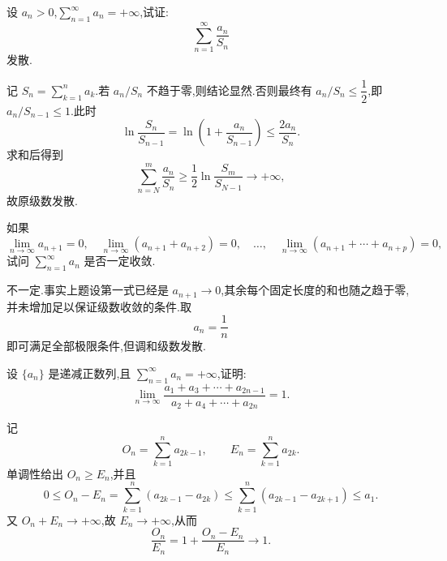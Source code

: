 \begin{example}
    设 $a_n>0$,$\displaystyle\sum\limits_{n=1}^{\infty}a_n=+\infty$,试证:
    \[
        \displaystyle\sum\limits_{n=1}^{\infty}\dfrac{a_n}{S_n}
    \]
    发散.
\end{example}
\exampleblank

\begin{solution}
    记 $\displaystyle S_n=\sum\limits_{k=1}^{n}a_k$.若 $a_n/S_n$ 不趋于零,则结论显然.否则最终有 $a_n/S_n\leq\dfrac{1}{2}$,即 $a_n/S_{n-1}\leq1$.此时
    \[
        \ln\dfrac{S_n}{S_{n-1}}
        =\ln\left(1+\dfrac{a_n}{S_{n-1}}\right)
        \leq\dfrac{2a_n}{S_n}.
    \]
    求和后得到
    \[
        \displaystyle\sum\limits_{n=N}^{m}\dfrac{a_n}{S_n}
        \geq\dfrac{1}{2}\ln\dfrac{S_m}{S_{N-1}}\longrightarrow+\infty,
    \]
    故原级数发散.
\end{solution}

\begin{example}
    如果
    \[
        \displaystyle\lim\limits_{n\to\infty}a_{n+1}=0,
        \quad
        \lim\limits_{n\to\infty}(a_{n+1}+a_{n+2})=0,
        \quad\ldots,\quad
        \lim\limits_{n\to\infty}(a_{n+1}+\cdots+a_{n+p})=0,
    \]
    试问 $\displaystyle\sum\limits_{n=1}^{\infty}a_n$ 是否一定收敛.
\end{example}
\exampleblank

\begin{solution}
    不一定.事实上题设第一式已经是 $a_{n+1}\to0$,其余每个固定长度的和也随之趋于零,并未增加足以保证级数收敛的条件.取
    \[
        a_n=\dfrac{1}{n}
    \]
    即可满足全部极限条件,但调和级数发散.
\end{solution}

\begin{example}
    设 $\{a_n\}$ 是递减正数列,且 $\displaystyle\sum\limits_{n=1}^{\infty}a_n=+\infty$,证明:
    \[
        \displaystyle\lim\limits_{n\to\infty}
        \dfrac{a_1+a_3+\cdots+a_{2n-1}}{a_2+a_4+\cdots+a_{2n}}=1.
    \]
\end{example}
\exampleblank

\begin{solution}
    记
    \[
        O_n=\sum\limits_{k=1}^{n}a_{2k-1},\qquad
        E_n=\sum\limits_{k=1}^{n}a_{2k}.
    \]
    单调性给出 $O_n\geq E_n$,并且
    \[
        0\leq O_n-E_n
        =\sum\limits_{k=1}^{n}(a_{2k-1}-a_{2k})
        \leq\sum\limits_{k=1}^{n}(a_{2k-1}-a_{2k+1})
        \leq a_1.
    \]
    又 $O_n+E_n\to+\infty$,故 $E_n\to+\infty$,从而
    \[
        \dfrac{O_n}{E_n}=1+\dfrac{O_n-E_n}{E_n}\longrightarrow\boxed1.
    \]
\end{solution}

